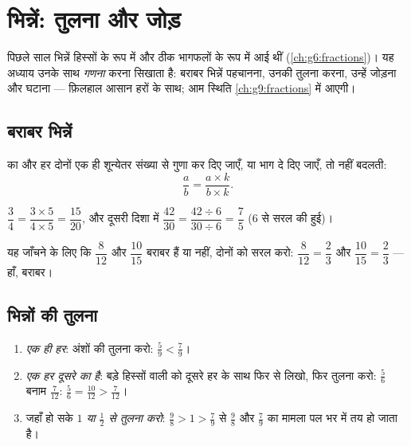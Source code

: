 \chapter{भिन्नें: तुलना और जोड़}\label{ch:g7:fractions}

पिछले साल भिन्नें हिस्सों के रूप में और ठीक भागफलों के रूप में
आई थीं (\cref{ch:g6:fractions})। यह अध्याय उनके साथ \emph{गणना}
करना सिखाता है: बराबर भिन्नें पहचानना, उनकी तुलना करना, उन्हें
जोड़ना और घटाना --- फ़िलहाल आसान हरों के साथ; आम स्थिति
\cref{ch:g9:fractions} में आएगी।

\section{बराबर भिन्नें}

\begin{theorem}[बराबर भिन्नें]\label{thm:g7:fractions:equal}
 का  और हर दोनों एक ही शून्येतर संख्या से गुणा कर दिए
जाएँ, या भाग दे दिए जाएँ, तो  नहीं बदलती:
\[
\frac{a}{b} = \frac{a \times k}{b \times k} .
\]
\end{theorem}
\admitted

\begin{example}\label{ex:g7:fractions:equal}
$\dfrac{3}{4} = \dfrac{3 \times 5}{4 \times 5} = \dfrac{15}{20}$, और
दूसरी दिशा में $\dfrac{42}{30} = \dfrac{42 \div 6}{30 \div 6}
= \dfrac{7}{5}$ ($6$ से सरल की हुई)।

यह जाँचने के लिए कि $\dfrac{8}{12}$ और $\dfrac{10}{15}$ बराबर हैं
या नहीं, दोनों को सरल करो: $\dfrac{8}{12} = \dfrac{2}{3}$ और
$\dfrac{10}{15} = \dfrac{2}{3}$ --- हाँ, बराबर।
\end{example}

\section{भिन्नों की तुलना}

\begin{method}[दो भिन्नों की तुलना]\label{met:g7:fractions:compare}
\begin{enumerate}
  \item \emph{एक ही हर}: अंशों की तुलना करो:
        $\frac{5}{9} < \frac{7}{9}$।
  \item \emph{एक हर दूसरे का  है}: बड़े हिस्सों वाली  को
        दूसरे हर के साथ फिर से लिखो, फिर तुलना करो:
        $\frac{5}{6}$ बनाम $\frac{7}{12}$: $\frac56 = \frac{10}{12} >
        \frac{7}{12}$।
  \item जहाँ हो सके \emph{$1$ या $\frac12$ से तुलना करो}:
        $\frac{9}{8} > 1 > \frac{7}{9}$ से $\frac98$ और $\frac79$ का
        मामला पल भर में तय हो जाता है।
\end{enumerate}
\end{method}

